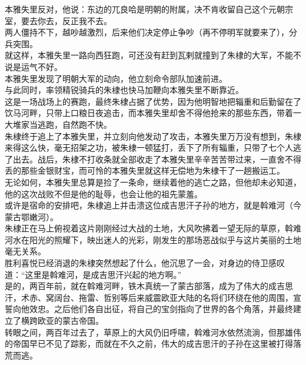 \begin{multicols}{\theparacolNo}
本雅失里反对，他说：东边的兀良哈是明朝的附属，决不肯收留自己这个元朝宗室，要去你去，反正我不去。\\

两人僵持不下，越吵越激烈，后来他们决定停止争吵（再不停明军就要来了），分兵突围。\\

就这样，本雅失里一路向西狂跑，可还没有赶到瓦剌就撞到了朱棣的大军，不能不说是运气不好。\\

本雅失里发现了明朝大军的动向，他立刻命令部队加速前进。\\

与此同时，率领精锐骑兵的朱棣也快马加鞭向本雅失里不断靠近。\\

这是一场战场上的赛跑，最终朱棣占据了优势，因为他明智地把辎重和后勤留在了饮马河畔，只带上口粮日夜追击，而本雅失里却舍不得他抢来的那些东西，带着一大堆家当逃跑，自然跑不快。\\

朱棣终于追上了本雅失里，并立刻向他发动了攻击，本雅失里万万没有想到，朱棣来得这么快，毫无招架之功，被朱棣一顿猛打，丢下了所有辎重，只带了七个人逃了出去。战后，朱棣不打收条就全部收走了本雅失里辛辛苦苦带过来，一直舍不得丢的那些金银财宝，而可怜的本雅失里就这样无偿地为朱棣干了一趟搬运工。\\

无论如何，本雅失里总算是捡了一条命，继续着他的逃亡之路，但他却未必知道，他的这次战败不但是他的耻辱，也会让他的祖先蒙羞。\\

或许是宿命的安排吧，朱棣追上并击溃这位成吉思汗子孙的地方，就是斡难河（今蒙古鄂嫩河）。\\

朱棣正在马上俯视着这片刚刚经过大战的土地，大风吹拂着一望无际的草原，斡难河水在阳光的照耀下，映出迷人的光彩，刚发生的那场恶战似乎与这片美丽的土地毫无关系。\\

胜利喜悦已经消退的朱棣突然想起了什么，他沉思了一会，对身边的侍卫感叹道：“这里是斡难河，是成吉思汗兴起的地方啊。”\\

是的，两百年前，就在斡难河畔，铁木真统一了蒙古部落，成为了伟大的成吉思汗，术赤、窝阔台、拖雷、哲别等后来威震欧亚大陆的名将们环绕在他的周围，宣誓向他效忠。之后他们各自出征，将自己的宝剑指向了世界的各个角落，并最终建立了横跨欧亚的蒙古帝国。\\

转眼之间，两百年过去了，草原上的大风仍旧呼啸，斡难河水依然流淌，但那雄伟的帝国早已不见了踪影，而就在不久之前，伟大的成吉思汗的子孙在这里被打得落荒而逃。\\


\end{multicols}
